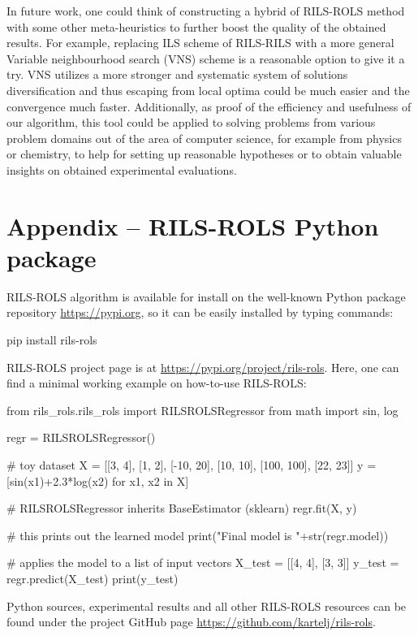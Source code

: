 \documentclass{bmcart}
\begin{document}
In future work, one could think of constructing a hybrid of \textsc{RILS-ROLS} method with some other meta-heuristics to further boost the quality of the obtained results. For example, replacing ILS scheme of \textsc{RILS-RILS} with a more general Variable neighbourhood search (VNS) scheme is a reasonable option to give it a try. VNS   utilizes a more stronger and systematic system of solutions diversification and thus escaping from local optima could be much easier and the convergence much faster.  Additionally, as proof of the efficiency and usefulness of our algorithm, this tool could be applied to solving problems from various problem domains out of the area of computer science, for example from physics or chemistry, to help for setting up reasonable hypotheses or to obtain valuable insights on obtained experimental evaluations.  

\section*{Appendix -- \textsc{RILS}-\textsc{ROLS} Python package}\label{sec:appendix-1}

\textsc{RILS-ROLS} algorithm is available for install on the well-known Python package repository \url{https://pypi.org}, so it can be easily installed by typing commands:
\begin{python} 
	pip install rils-rols
\end{python}
\textsc{RILS-ROLS} project page is at \url{https://pypi.org/project/rils-rols}. Here, one can find a minimal working example on how-to-use \textsc{RILS-ROLS}:

\begin{python}
	from rils_rols.rils_rols import RILSROLSRegressor
	from math import sin, log
	
	regr = RILSROLSRegressor()
	
	# toy dataset 
	X = [[3, 4], [1, 2], [-10, 20], [10, 10], [100, 100], [22, 23]]
	y = [sin(x1)+2.3*log(x2) for x1, x2 in X]
	
	# RILSROLSRegressor inherits BaseEstimator (sklearn)
	regr.fit(X, y)
	
	# this prints out the learned model
	print("Final model is "+str(regr.model))
	
	# applies the model to a list of input vectors
	X_test = [[4, 4], [3, 3]]
	y_test = regr.predict(X_test)
	print(y_test) 
\end{python}

Python sources, experimental results and all other \textsc{RILS-ROLS} resources can be found under the project GitHub page \url{https://github.com/kartelj/rils-rols}. 
 
\end{document}
